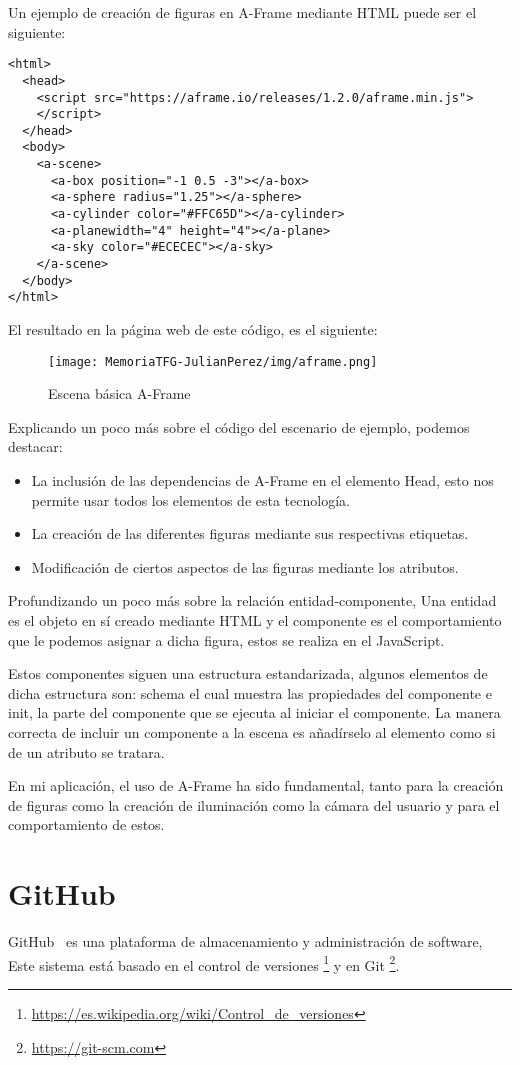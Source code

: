 \documentclass[a4paper, 12pt]{book}
\begin{document}
Un ejemplo de creación de figuras en A-Frame mediante HTML puede ser el siguiente:
{\scriptsize
\begin{verbatim}
<html>
  <head>
    <script src="https://aframe.io/releases/1.2.0/aframe.min.js">
    </script>
  </head>
  <body>
    <a-scene>
      <a-box position="-1 0.5 -3"></a-box>
      <a-sphere radius="1.25"></a-sphere>
      <a-cylinder color="#FFC65D"></a-cylinder>
      <a-planewidth="4" height="4"></a-plane>
      <a-sky color="#ECECEC"></a-sky>
    </a-scene>
  </body>
</html>
\end{verbatim}
}
El resultado en la página web de este código, es el siguiente:
\begin{figure}[H]
  \centering
  \texttt{[image: MemoriaTFG-JulianPerez/img/aframe.png]}
  \caption{Escena básica A-Frame}\label{aframe}
\end{figure}
Explicando un poco más sobre el código del escenario de ejemplo, podemos destacar: 
\begin{itemize}
    \item La inclusión de las dependencias de A-Frame en el elemento Head, esto nos permite usar todos los elementos de esta tecnología.
    \item La creación de las diferentes figuras mediante sus respectivas etiquetas.
    \item Modificación de ciertos aspectos de las figuras mediante los atributos.
\end{itemize}
Profundizando un poco más sobre la relación entidad-componente, Una entidad es el objeto en sí creado mediante HTML y el componente es el comportamiento que le podemos asignar a dicha figura, estos se realiza en el JavaScript. 

Estos componentes siguen una estructura estandarizada, algunos elementos de dicha estructura son: schema el cual muestra las propiedades del componente e init, la parte del componente que se ejecuta al iniciar el componente. La manera correcta de incluir un componente a la escena es añadírselo al elemento como si de un atributo se tratara.

En mi aplicación, el uso de A-Frame ha sido fundamental, tanto para la creación de figuras como la creación de iluminación como la cámara del usuario y para el comportamiento de estos.

\section{GitHub} %
\label{sec:GitHub}
GitHub~\cite{GITHUB} es una plataforma de almacenamiento y administración  de software, Este sistema está basado en el control de versiones \footnote{\url{https://es.wikipedia.org/wiki/Control_de_versiones}} y en Git \footnote{\url{https://git-scm.com}}.
\end{document}
